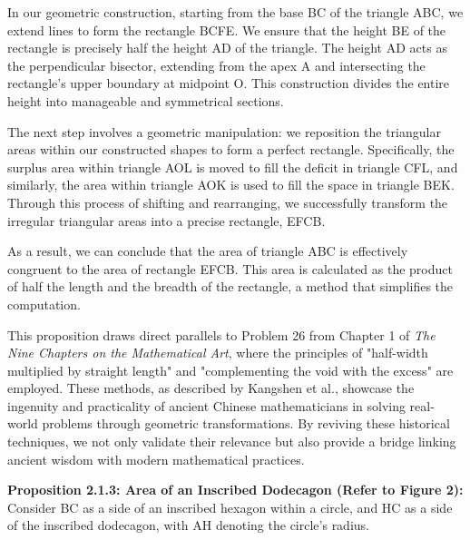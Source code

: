 \documentclass[10pt]{article}
\begin{document}
\vspace{20pt}

In our geometric construction, starting from the base BC of the triangle ABC, we extend lines to form the rectangle BCFE. We ensure that the height BE of the rectangle is precisely half the height AD of the triangle. The height AD acts as the perpendicular bisector, extending from the apex A and intersecting the rectangle's upper boundary at midpoint O. This construction  divides the entire height into manageable and symmetrical sections.

\vspace{7pt}

The next step involves a geometric manipulation: we reposition the triangular areas within our constructed shapes to form a perfect rectangle. Specifically, the surplus area within triangle AOL is moved to fill the deficit in triangle CFL, and similarly, the area within triangle AOK is used to fill the space in triangle BEK. Through this process of shifting and rearranging, we successfully transform the irregular triangular areas into a precise rectangle, EFCB. 

\vspace{7pt}

As a result, we can conclude that the area of triangle ABC is effectively congruent to the area of rectangle EFCB. This area is calculated as the product of half the length and the breadth of the rectangle, a method that simplifies the computation. 

\vspace{7pt}

This proposition draws direct parallels to Problem 26 from Chapter 1 of \textit{The Nine Chapters on the Mathematical Art}, where the principles of "half-width multiplied by straight length" and "complementing the void with the excess" are employed. These methods, as described by Kangshen et al.\autocite{Kangshen_Crossley}, showcase the ingenuity and practicality of ancient Chinese mathematicians in solving real-world problems through geometric transformations. By reviving these historical techniques, we not only validate their relevance but also provide a bridge linking ancient wisdom with modern mathematical practices.

\vspace{15pt}

\textbf{Proposition 2.1.3: Area of an Inscribed Dodecagon (Refer to Figure 2):}
Consider BC as a side of an inscribed hexagon within a circle, and HC as a side of the inscribed dodecagon, with AH denoting the circle's radius.
\end{document}
